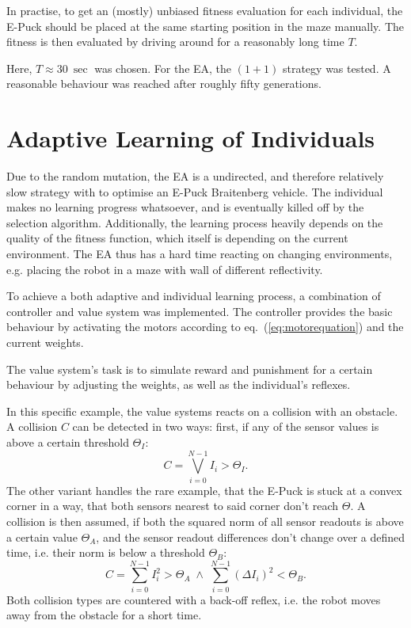 \documentclass[a4paper]{jacow}
\begin{document}
In practise, to get an (mostly) unbiased fitness evaluation for each individual, the E-Puck should be placed at the same starting position in the maze manually. The fitness is then evaluated by driving around for a reasonably long time $T$. 

Here, $T\approx\SI{30}{\sec}$ was chosen. For the EA, the $(1+1)$ strategy was tested. A reasonable behaviour was reached after roughly fifty generations.


\section{Adaptive Learning of Individuals}

Due to the random mutation, the EA is a undirected, and therefore relatively slow strategy with to optimise an E-Puck Braitenberg vehicle. The individual makes no learning progress whatsoever, and is eventually killed off by the selection algorithm. Additionally, the learning process heavily depends on the quality of the fitness function, which itself is depending on the current environment. The EA thus has a hard time reacting on changing environments, e.g. placing the robot in a maze with wall of different reflectivity.

To achieve a both adaptive and individual learning process, a combination of controller and value system was implemented. The controller provides the basic behaviour by activating the motors according to eq.~(\ref{eq:motorequation}) and the current weights.

The value system's task is to simulate reward and punishment for a certain behaviour by adjusting the weights, as well as the individual's reflexes.

In this specific example, the value systems reacts on a collision with an obstacle. A collision $C$ can be detected in two ways: first, if any of the sensor values is above a certain threshold $\Theta_I$:
\begin{equation}
	C = \bigvee\limits_{i=0}^{N-1} I_i > \Theta_I. 
\end{equation}
The other variant handles the rare example, that the E-Puck is stuck at a convex corner in a way, that both sensors nearest to said corner don't reach $\Theta$. A collision is then assumed, if both the squared norm of all sensor readouts is above a certain value $\Theta_A$, and the sensor readout differences don't change over a defined time, i.e. their norm is below a threshold $\Theta_B$:
\begin{equation}
	C = \sum\limits_{i=0}^{N-1} I_i^2 > \Theta_A \;\wedge\; \sum\limits_{i=0}^{N-1} (\Delta I_i)^2 < \Theta_B.
\end{equation}
Both collision types are countered with a back-off reflex, i.e. the robot moves away from the obstacle for a short time.
\end{document}
